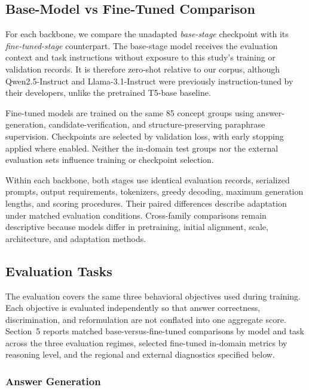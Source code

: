 \documentclass[a4paper,fleqn]{cas-sc}
\begin{document}
\subsection{Base-Model vs Fine-Tuned Comparison}

For each backbone, we compare the unadapted \emph{base-stage} checkpoint with its \emph{fine-tuned-stage} counterpart. The base-stage model receives the evaluation context and task instructions without exposure to this study's training or validation records. It is therefore zero-shot relative to our corpus, although Qwen2.5-Instruct and Llama-3.1-Instruct were previously instruction-tuned by their developers, unlike the pretrained T5-base baseline.

Fine-tuned models are trained on the same 85 concept groups using answer-generation, candidate-verification, and structure-preserving paraphrase supervision. Checkpoints are selected by validation loss, with early stopping applied where enabled. Neither the in-domain test groups nor the external evaluation sets influence training or checkpoint selection.

Within each backbone, both stages use identical evaluation records, serialized prompts, output requirements, tokenizers, greedy decoding, maximum generation lengths, and scoring procedures. Their paired differences describe adaptation under matched evaluation conditions. Cross-family comparisons remain descriptive because models differ in pretraining, initial alignment, scale, architecture, and adaptation methods.

\subsection{Evaluation Tasks}

The evaluation covers the same three behavioral objectives used during training. Each objective is evaluated independently so that answer correctness, discrimination, and reformulation are not conflated into one aggregate score. Section~5 reports matched base-versus-fine-tuned comparisons by model and task across the three evaluation regimes, selected fine-tuned in-domain metrics by reasoning level, and the regional and external diagnostics specified below.

\subsubsection{Answer Generation}
\end{document}
